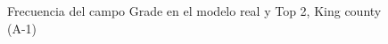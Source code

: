 \begin{figure}[H]
    \centering
    
    \caption{Frecuencia del campo Grade en el modelo real y Top 2, King county (A-1)}
    \label{frecuency-top2-grade}
\end{figure}